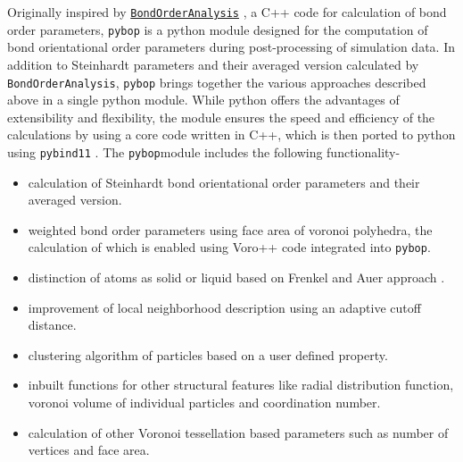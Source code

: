 \documentclass[]{article}
\providecommand{\tightlist}{%
  \setlength{\itemsep}{0pt}\setlength{\parskip}{0pt}}
\begin{document}
Originally inspired by
\href{https://homepage.univie.ac.at/wolfgang.lechner/bondorderparameter.html}{\texttt{BondOrderAnalysis}}
\citep{Lechner:2010}, a C++ code for calculation of bond order
parameters, \texttt{pybop} is a python module designed for the
computation of bond orientational order parameters during
post-processing of simulation data. In addition to Steinhardt parameters
and their averaged version calculated by \texttt{BondOrderAnalysis},
\texttt{pybop} brings together the various approaches described above in
a single python module. While python offers the advantages of
extensibility and flexibility, the module ensures the speed and
efficiency of the calculations by using a core code written in C++,
which is then ported to python using \texttt{pybind11}
\citep{Jakob:2016}. The \texttt{pybop}module includes the following
functionality-

\begin{itemize}
\tightlist
\item
  calculation of Steinhardt bond orientational order parameters and
  their averaged version.
\item
  weighted bond order parameters using face area of voronoi polyhedra,
  the calculation of which is enabled using Voro++ code
  \citep{Rycroft:2009} integrated into \texttt{pybop}.
\item
  distinction of atoms as solid or liquid based on Frenkel and Auer
  approach \citep{Auer:2005}.
\item
  improvement of local neighborhood description using an adaptive cutoff
  distance.
\item
  clustering algorithm of particles based on a user defined property.
\item
  inbuilt functions for other structural features like radial
  distribution function, voronoi volume of individual particles and
  coordination number.
\item
  calculation of other Voronoi tessellation based parameters such as
  number of vertices and face area.
\end{itemize}
\end{document}
